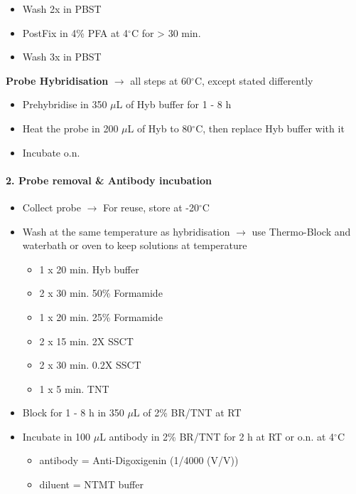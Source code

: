 \documentclass[11pt,singlespacinge,twoside]{reedthesis} %
\providecommand{\tightlist}{%
  \setlength{\itemsep}{0pt}\setlength{\parskip}{0pt}}
\begin{document}
\begin{itemize}
\tightlist
\item
  Wash 2x in PBST
\item
  PostFix in 4\% PFA at 4\(^\circ\)C for \textgreater{} 30 min.
\item
  Wash 3x in PBST
\end{itemize}
\textbf{Probe Hybridisation} \newline \(\rightarrow\) all steps at 60\(^\circ\)C, except stated differently
\begin{itemize}
\tightlist
\item
  Prehybridise in 350 \(\mu\)L of Hyb buffer for 1 - 8 h
\item
  Heat the probe in 200 \(\mu\)L of Hyb to 80\(^\circ\)C, then replace Hyb buffer with it
\item
  Incubate o.n.
\end{itemize}
\hypertarget{probe-removal-antibody-incubation}{%
\paragraph{2. Probe removal \& Antibody incubation}\label{probe-removal-antibody-incubation}}
\begin{itemize}
\tightlist
\item
  Collect probe \newline \(\rightarrow\) For reuse, store at -20\(^\circ\)C
\item
  Wash at the same temperature as hybridisation \newline \(\rightarrow\) use Thermo-Block and waterbath or oven to keep solutions at temperature
  \begin{itemize}
  \tightlist
  \item
    1 x 20 min. Hyb buffer
  \item
    2 x 30 min. 50\% Formamide
  \item
    1 x 20 min. 25\% Formamide
  \item
    2 x 15 min. 2X SSCT
  \item
    2 x 30 min. 0.2X SSCT
  \item
    1 x 5 min. TNT
  \end{itemize}
\item
  Block for 1 - 8 h in 350 \(\mu\)L of 2\% BR/TNT at RT
\item
  Incubate in 100 \(\mu\)L antibody in 2\% BR/TNT for 2 h at RT or o.n. at 4\(^\circ\)C
  \begin{itemize}
  \tightlist
  \item
    antibody = Anti-Digoxigenin (1/4000 (V/V))
  \item
    diluent = NTMT buffer
  \end{itemize}
\end{itemize}
\end{document}
